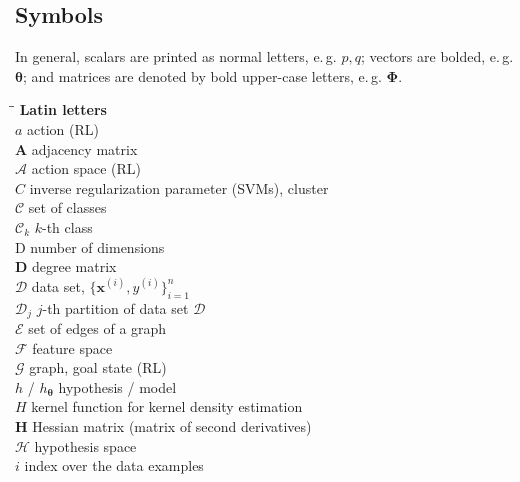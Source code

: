 \documentclass[12pt]{article}
\begin{document}
\subsection*{Symbols}

In general, scalars are printed as normal letters, e.\,g. $p, q$; vectors are bolded, e.\,g. $\bm{\theta}$; and matrices are denoted by bold upper-case letters, e.\,g. $\bm{\Phi}$. 

\begin{tabbing}
	\hspace*{2mm}\=\hspace*{4.15cm}\=\kill
	\textbf{Latin letters} 																					\\[3mm]
	\> $a$										\>	action (RL)											\\[3mm]
	\> $\bm{A}$									\>	adjacency matrix										\\[3mm]
	\> $\mathcal{A}$								\>	action space (RL)										\\[3mm]
	\> $C$										\>	inverse regularization parameter (SVMs), cluster				\\[3mm]
	\> $\mathcal{C}$								\>	set of classes										\\[3mm]
	\> $\mathcal{C}_k$								\>	$k$-th class										\\[3mm]
	\> D											\>	number of dimensions									\\[3mm]
	\> $\bm{D}$									\>	degree matrix										\\[3mm]
	\> $\mathcal{D}$								\>	data set, $\{ \bm{x}^{(i)}, y^{(i)} \}_{i=1}^n$				\\[3mm]
	\> $\mathcal{D}_j$								\>	$j$-th partition of data set $\mathcal{D}$					\\[3mm]
	\> $\mathcal{E}$								\>	set of edges of a graph								\\[3mm]
	\> $\mathcal{F}$								\>	feature space										\\[3mm]
	\> $\mathcal{G}$								\>	graph, goal state (RL)									\\[3mm]
	\> $h$ / $h_{\bm{\theta}}$						\>	hypothesis / model									\\[3mm]
	\> $H$										\>	kernel function for kernel density estimation					\\[3mm]
	\> $\bm{H}$									\>	Hessian matrix (matrix of second derivatives)					\\[3mm]
	\> $\mathcal{H}$								\>	hypothesis space										\\[3mm]
	\> $i$										\>	index over the data examples							\\[3mm]

\end{tabbing}
\end{document}
